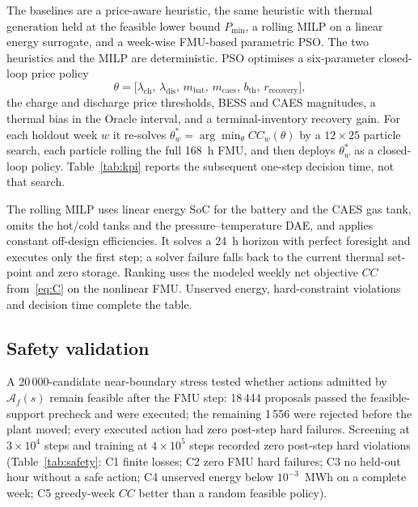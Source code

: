 \documentclass[conference]{IEEEtran}
\newcommand{\Afhat}{\widehat{\mathcal{A}}_{f}}
\begin{document}
The baselines are a price-aware heuristic, the same heuristic with thermal generation held at the feasible lower bound \(P_{\min}\), a rolling MILP on a linear energy surrogate, and a week-wise FMU-based parametric PSO. The two heuristics and the MILP are deterministic. PSO optimises a six-parameter closed-loop price policy
\begin{equation}
\theta
=
\bigl[\lambda_{\mathrm{ch}},\,\lambda_{\mathrm{dis}},\,m_{\mathrm{bat}},\,m_{\mathrm{caes}},\,b_{\mathrm{th}},\,r_{\mathrm{recovery}}\bigr],
\label{eq:pso-theta}
\end{equation}
the charge and discharge price thresholds, BESS and CAES magnitudes, a thermal bias in the Oracle interval, and a terminal-inventory recovery gain. For each holdout week \(w\) it re-solves \(\theta_w^*=\arg\min_\theta CC_w(\theta)\) by a \(12\times25\) particle search, each particle rolling the full 168~h FMU, and then deploys \(\theta_w^*\) as a closed-loop policy. Table~\ref{tab:kpi} reports the subsequent one-step decision time, not that search.

The rolling MILP uses linear energy SoC for the battery and the CAES gas tank, omits the hot/cold tanks and the pressure--temperature DAE, and applies constant off-design efficiencies. It solves a 24~h horizon with perfect foresight and executes only the first step; a solver failure falls back to the current thermal set-point and zero storage. Ranking uses the modeled weekly net objective \(CC\) from~\eqref{eq:C} on the nonlinear FMU. Unserved energy, hard-constraint violations and decision time complete the table.

\subsection{Safety validation}
\label{sec:learn}

A 20\,000-candidate near-boundary stress tested whether actions admitted by \(\Afhat(s)\) remain feasible after the FMU step: 18\,444 proposals passed the feasible-support precheck and were executed; the remaining 1\,556 were rejected before the plant moved; every executed action had zero post-step hard failures. Screening at \(3\times10^{4}\) steps and training at \(4\times10^{5}\) steps recorded zero post-step hard violations (Table~\ref{tab:safety}: C1 finite losses; C2 zero FMU hard failures; C3 no held-out hour without a safe action; C4 unserved energy below \(10^{-3}\)~MWh on a complete week; C5 greedy-week \(CC\) better than a random feasible policy).
\end{document}
